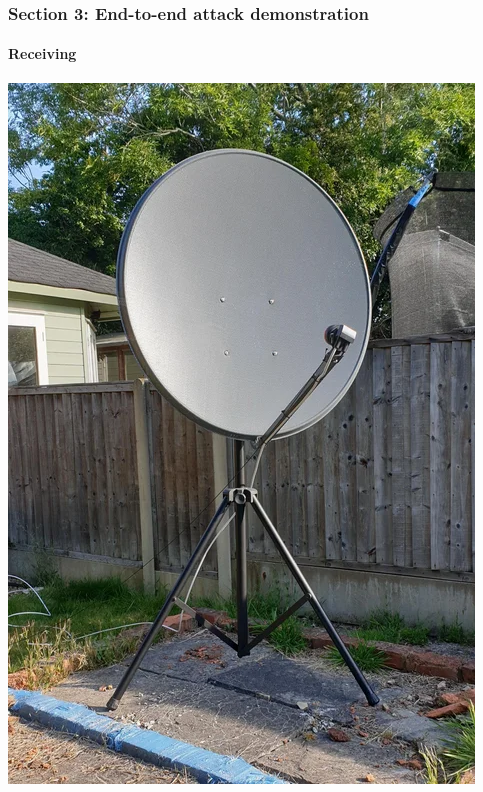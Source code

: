\documentclass{beamer}
\begin{document}
\begin{frame}
  \frametitle{Section 3: End-to-end attack demonstration}
  \framesubtitle{Receiving}
  \centering
  \includegraphics[width=0.5\columnwidth]{images/dish.png}
\end{frame}
\end{document}

